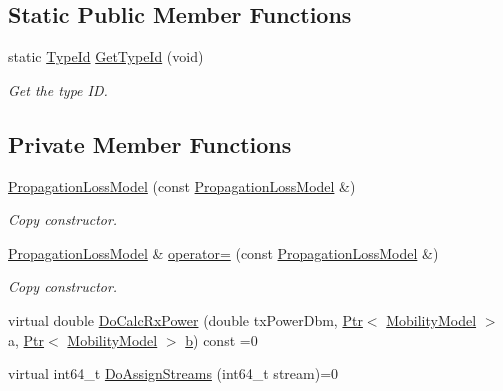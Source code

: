 \subsection*{Static Public Member Functions}
\begin{DoxyCompactItemize}
\item 
static \hyperlink{classns3_1_1TypeId}{Type\+Id} \hyperlink{classns3_1_1PropagationLossModel_ad8fe64f798fce3e791dc0c274d9af0b7}{Get\+Type\+Id} (void)
\begin{DoxyCompactList}\small\item\em Get the type ID. \end{DoxyCompactList}\end{DoxyCompactItemize}
\subsection*{Private Member Functions}
\begin{DoxyCompactItemize}
\item 
\hyperlink{classns3_1_1PropagationLossModel_a3ab0858f3af8c1b7357f925ccf16b85f}{Propagation\+Loss\+Model} (const \hyperlink{classns3_1_1PropagationLossModel}{Propagation\+Loss\+Model} \&)
\begin{DoxyCompactList}\small\item\em Copy constructor. \end{DoxyCompactList}\item 
\hyperlink{classns3_1_1PropagationLossModel}{Propagation\+Loss\+Model} \& \hyperlink{classns3_1_1PropagationLossModel_ab109bd0442d48e13a3b3ac368eaaf552}{operator=} (const \hyperlink{classns3_1_1PropagationLossModel}{Propagation\+Loss\+Model} \&)
\begin{DoxyCompactList}\small\item\em Copy constructor. \end{DoxyCompactList}\item 
virtual double \hyperlink{classns3_1_1PropagationLossModel_aa6bb73e4132dc5d8e1b49750955838bb}{Do\+Calc\+Rx\+Power} (double tx\+Power\+Dbm, \hyperlink{classns3_1_1Ptr}{Ptr}$<$ \hyperlink{classns3_1_1MobilityModel}{Mobility\+Model} $>$ a, \hyperlink{classns3_1_1Ptr}{Ptr}$<$ \hyperlink{classns3_1_1MobilityModel}{Mobility\+Model} $>$ \hyperlink{lte__pathloss_8m_a21ad0bd836b90d08f4cf640b4c298e7c}{b}) const =0
\item 
virtual int64\+\_\+t \hyperlink{classns3_1_1PropagationLossModel_a1af4724c8961a86455fa381f00d7be11}{Do\+Assign\+Streams} (int64\+\_\+t stream)=0
\end{DoxyCompactItemize}
